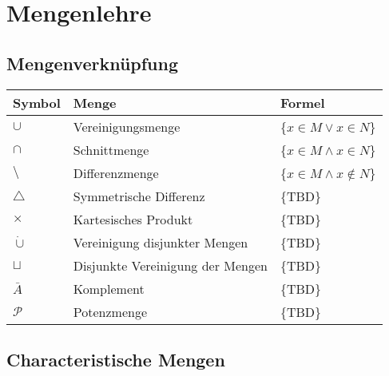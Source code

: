 
\section{Mengenlehre}

\subsection{Mengenverknüpfung}

\begin{tabular}[h]{lll}

Symbol &Menge & Formel \\
\hline
$\cup$ & Vereinigungsmenge	 & \{$x \in M \lor x \in N$\} \\
$\cap$ & Schnittmenge	 & \{$x \in M \land x \in N$\} \\
$\setminus$ & Differenzmenge	 & \{$x \in M \land x \notin N$\} \\
$\triangle$ & Symmetrische Differenz & \{TBD\} \\
$\times$ & Kartesisches Produkt & \{TBD\} \\
$\dot\cup$ & Vereinigung disjunkter Mengen  & \{TBD\} \\
$\sqcup$ & Disjunkte Vereinigung der Mengen  & \{TBD\} \\
$\bar{A}$ & Komplement & \{TBD\} \\
$\mathcal{P}$ & Potenzmenge & \{TBD\} \\
\end{tabular}

\subsection{Characteristische Mengen}

